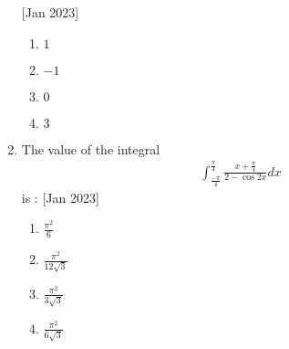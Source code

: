\documentclass[journal]{IEEEtran}
\begin{document}
\begin{enumerate}
	 	\hfill{[Jan 2023]}
		\begin{enumerate}
			\item $1$
			\item $-1$
			\item $0$
			\item $3$
        	\end{enumerate}
	\item The value of the integral 
             \begin{align*}
		\int_\frac{-\pi}{4}^\frac{\pi}{4}\frac{x+\frac{\pi}{4}}{2-\cos 2x}dx
             \end{align*}
	     is :
	     	\hfill{[Jan 2023]}
		\begin{enumerate}
			\item $\frac{\pi^2}{6}$
			\item $\frac{\pi^2}{12\sqrt{3}}$
	         	\item $\frac{\pi^2}{3\sqrt{3}}$
                 	\item $\frac{\pi^2}{6\sqrt{3}}$
	\end{enumerate}	
\end{enumerate}		
\end{document}
